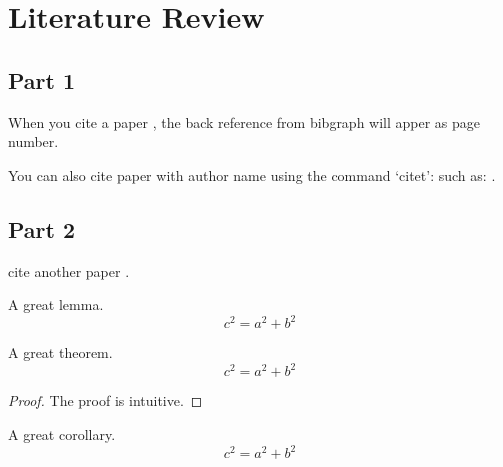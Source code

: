 
\chapter{Literature Review} %
\label{ch:literature_review} %


\section{Part 1}

When you cite a paper \cite{bauschke2011convex}, the back reference from bibgraph will apper as page number.

You can also cite paper with author name using the command `citet': such as: \citet{bauschke2011convex}.

\section{Part 2}

cite another paper \cite{DynamicOptim_Opportunities_challenges}.

\begin{lemma}[My lemma]
	A great lemma.
	\begin{equation}
		c^2=a^2+b^2
	\end{equation}
\end{lemma}

\begin{theorem}[My theorem]
	A great theorem.
	\begin{equation}
		c^2=a^2+b^2
	\end{equation}
\end{theorem}

\begin{proof}
	The proof is intuitive.
\end{proof}

\begin{corollary}[My corollary]
	A great corollary.
	\begin{equation}
		c^2=a^2+b^2
	\end{equation}
\end{corollary}

